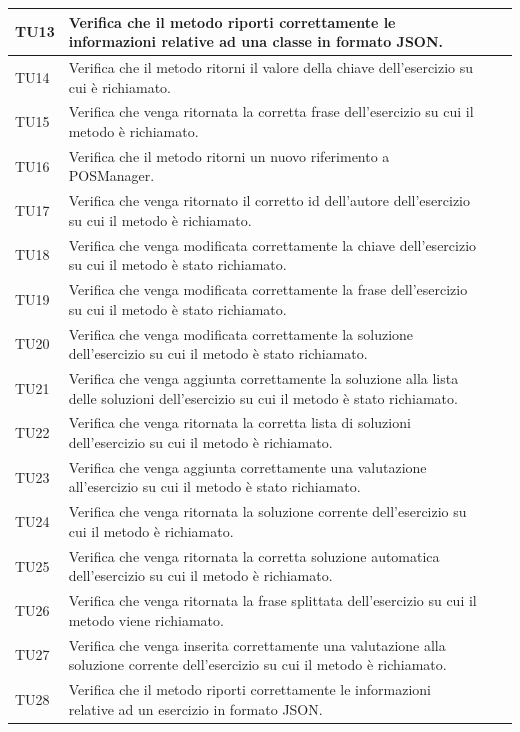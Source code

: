 \begin{longtable}{|>{\centering\arraybackslash}m{1.6cm}|>{\centering\arraybackslash}m{6.41cm}|>{\centering\arraybackslash}m{3.1cm}| c |}
		TU13 & Verifica che il metodo riporti correttamente le informazioni relative ad una classe in formato JSON. \\ \hline	
		\rowcolor{LightGray}
		TU14 & Verifica che il metodo ritorni il valore della chiave dell'esercizio su cui è richiamato. \\ \hline
		TU15 & Verifica che venga ritornata la corretta frase dell'esercizio su cui il metodo è richiamato. \\ \hline
		\rowcolor{LightGray}
		TU16 & Verifica che il metodo ritorni un nuovo riferimento a POSManager.\\ \hline
		TU17 & Verifica che venga ritornato il corretto id dell'autore dell'esercizio su cui il metodo è richiamato.\\ \hline
		\rowcolor{LightGray}
		TU18 & Verifica che venga modificata correttamente la chiave dell'esercizio su cui il metodo è stato richiamato.\\ \hline
		TU19 & Verifica che venga modificata correttamente la frase dell'esercizio su cui il metodo è stato richiamato.\\ \hline
		\rowcolor{LightGray}
		TU20 & Verifica che venga modificata correttamente la soluzione dell'esercizio su cui il metodo è stato richiamato.\\ \hline
		TU21 & Verifica che venga aggiunta correttamente la soluzione alla lista delle soluzioni dell'esercizio su cui il metodo è stato richiamato.\\ \hline
		\rowcolor{LightGray}
		TU22 & Verifica che venga ritornata la corretta lista di soluzioni dell'esercizio su cui il metodo è richiamato.\\ \hline
		TU23 & Verifica che venga aggiunta correttamente una valutazione all'esercizio su cui il metodo è stato richiamato.\\ \hline
		\rowcolor{LightGray}
		TU24 & Verifica che venga ritornata la soluzione corrente dell'esercizio su cui il metodo è richiamato.\\ \hline
		TU25 & Verifica che venga ritornata la corretta soluzione automatica dell'esercizio su cui il metodo è richiamato. \\ \hline
		\rowcolor{LightGray}
		TU26 & Verifica che venga ritornata la frase splittata dell'esercizio su cui il metodo viene richiamato.\\ \hline
		TU27 & Verifica che venga inserita correttamente una valutazione alla soluzione corrente dell'esercizio su cui il metodo è richiamato.\\ \hline	
		\rowcolor{LightGray}	
		TU28 & Verifica che il metodo riporti correttamente le informazioni relative ad un esercizio in formato JSON. \\ \hline
			

\end{longtable}
